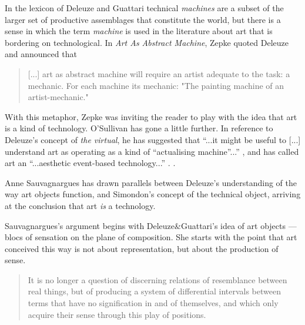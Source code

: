         In the lexicon of Deleuze and Guattari technical \emph{machines} are a subset of the larger set of productive assemblages that constitute the world, but there is a sense in which the term \emph{machine} is used in the literature about art that is bordering on technological. In \emph{Art As Abstract Machine}, Zepke quoted Deleuze and announced that 

        \begin{quote}
            [...] art as abstract machine will require an artist adequate to the task: a mechanic. For each machine its mechanic: "The painting machine of an artist-mechanic." \citep[p.1]{ZepkeArtAsAbstrctMchn2005}
        \end{quote}

        With this metaphor, Zepke was inviting the reader to play with the idea that art is a kind of technology. O'Sullivan has gone a little further. In reference to Deleuze's concept of \emph{the virtual}, he has suggested that “...it might be useful to [...] understand art as operating as a kind of “actualising machine”...” \citep[p.200]{ZepkeOSullivanDlzCntmprryArt2010}, and has called art an “...aesthetic event-based technology...” \citep[p.202]{ZepkeOSullivanDlzCntmprryArt2010}.
         .

        Anne Sauvagnargues has drawn parallels between Deleuze's understanding of the way art objects function, and Simondon's concept of the technical object, arriving at the conclusion that art \emph{is} a technology.
        
        Sauvagnargues's argument begins with Deleuze\&Guattari's idea of art objects — blocs of sensation on the plane of composition. She starts with the point that art conceived this way is not about representation, but about the production of sense.

        \begin{quote}
            It is no longer a question of discerning relations of resemblance between real things, but of producing a system of differential intervals between terms that have no signification in and of themselves, and which only acquire their sense through this play of positions. \citep[p.14]{SauvagnarguesArtmchns2016}
        \end{quote}

